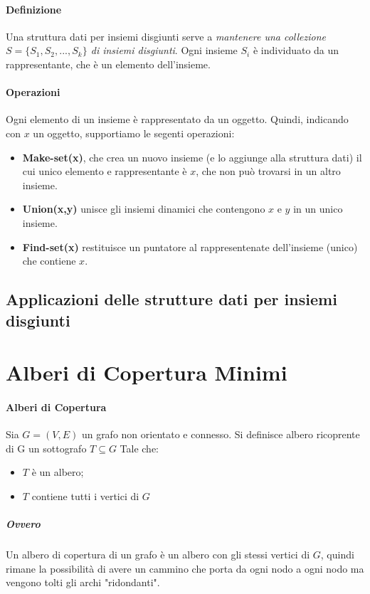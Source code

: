 \documentclass[12pt, a4paper, openany]{book}
\begin{document}
	\paragraph{Definizione}
	Una struttura dati per insiemi disgiunti serve a \emph{mantenere una collezione $S = \{S_1,S_2,...,S_k\}$ di insiemi disgiunti}.
	Ogni insieme $S_i$ è individuato da un rappresentante, che è un elemento dell'insieme.

	\paragraph{Operazioni}
	Ogni elemento di un insieme è rappresentato da un oggetto.
	Quindi, indicando con $x$ un oggetto, supportiamo le segenti operazioni:
	\begin{itemize}
		\item \textbf{Make-set(x)}, che crea un nuovo insieme (e lo aggiunge alla struttura dati) il cui unico elemento e rappresentante è $x$, che non può trovarsi in un altro insieme.
		\item \textbf{Union(x,y)} unisce gli insiemi dinamici che contengono $x$ e $y$ in un unico insieme.
		\item \textbf{Find-set(x)} restituisce un puntatore al rappresentenate dell'insieme (unico) che contiene $x$.
	\end{itemize}
	\subsection*{Applicazioni delle strutture dati per insiemi disgiunti}

	\section{Alberi di Copertura Minimi}
	\paragraph*{Alberi di Copertura}
	Sia $G=(V,E)$ un grafo non orientato e connesso.
	Si definisce albero ricoprente di G un sottografo $T\subseteq G$ Tale che:
	\begin{itemize}
		\item $T$ è un albero;
		\item $T$ contiene tutti i vertici di $G$
	\end{itemize}
	\subparagraph*{Ovvero} Un albero di copertura di un grafo è un albero con gli stessi vertici di $G$, quindi rimane 
	la possibilità di avere un cammino che porta da ogni nodo a ogni nodo ma vengono tolti gli archi "ridondanti".
\end{document}
